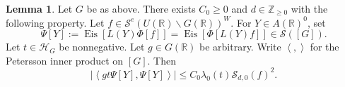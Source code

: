 \documentclass[reqno]{amsart}
\DeclareMathOperator{\Eis}{Eis}
\theoremstyle{plain} \newtheorem{theorem} {Theorem}
\theoremstyle{definition} \newtheorem{definition} [theorem] {Definition}
\theoremstyle{itplain} %
\newtheorem{lemma}[theorem]{Lemma}
\numberwithin{equation}{section}
\numberwithin{theorem}{section}
\renewcommand{\geq}{\geqslant}
\renewcommand{\leq}{\leqslant}
\begin{document}
\begin{lemma}\label{lem:standard2:matrix-coeff-bounds}
  Let $G$ be as above.  There exists $C_0 \geq 0$ and $d \in \mathbb{Z}_{\geq 0}$ with the following property.  Let $f \in \mathcal{S}^e(U(\mathbb{R}) \backslash G(\mathbb{R}))^W$.  For $Y \in A(\mathbb{R})^0$, set
  \begin{equation*}
    \Psi[Y] := \Eis[L(Y) \Phi[f]]  = \Eis[\Phi[L(Y) f]] \in \mathcal{S}([G]).
  \end{equation*}
  Let $t \in \mathcal{H}_G$ be nonnegative.  Let $g \in G(\mathbb{R})$ be arbitrary.  Write $\left\langle , \right\rangle$ for the Petersson inner product on $[G]$.  Then
  \begin{equation}\label{eq:leftlangle-g-t}
    |\left\langle g t \Psi[Y], \Psi[Y]  \right\rangle| \leq C_0 \lambda_0(t) \mathcal{S}_{d,0}(f)^2.
  \end{equation}
\end{lemma}
\end{document}
